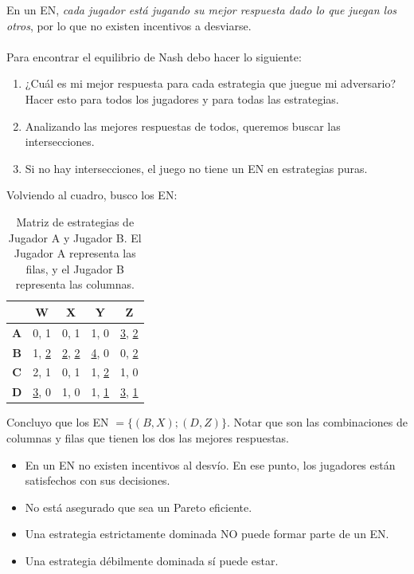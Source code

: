 \documentclass{article}
\newcommand{\ulcolor}[2][Red]{\setulcolor{#1}\ul{#2}}
\begin{document}
                En un EN, \emph{cada jugador está jugando su mejor respuesta dado lo que juegan los otros}, por lo que no existen incentivos a desviarse. \\
                \\
                Para encontrar el equilibrio de Nash debo hacer lo siguiente:
                \begin{enumerate}
                    \item ¿Cuál es mi mejor respuesta para cada estrategia que juegue mi adversario? Hacer esto para todos los jugadores y para todas las estrategias.
                    \item Analizando las mejores respuestas de todos, queremos buscar las intersecciones.
                    \item Si no hay intersecciones, el juego no tiene un EN en estrategias puras.
                \end{enumerate}
                Volviendo al cuadro, busco los EN:
                \begin{table}[H]
                    \centering
                    \begin{tabular}{|c|c|c|c|c|}
                        \hline
                                    & \textbf{W} & \textbf{X} & \textbf{Y} & \textbf{Z} \\ \hline
                        \textbf{A}  & 0, 1 & 0, 1 & 1, 0 & \ulcolor[Red]{3}, \ulcolor[Blue]{2} \\ \hline
                        \textbf{B}  & 1, \ulcolor[Blue]{2} & \ulcolor[Red]{2}, \ulcolor[Blue]{2} & \ulcolor[Red]{4}, 0 & 0, \ulcolor[Blue]{2} \\ \hline
                        \textbf{C}  & 2, 1 & 0, 1 & 1, \ulcolor[Blue]{2} & 1, 0 \\ \hline
                        \textbf{D}  & \ulcolor[Red]{3}, 0 & 1, 0 & 1, \ulcolor[Blue]{1} & \ulcolor[Red]{3}, \ulcolor[Blue]{1} \\ \hline
                    \end{tabular}
                    \caption{Matriz de estrategias de Jugador A y Jugador B. El Jugador A representa las filas, y el Jugador B representa las columnas.}
                \end{table}
                Concluyo que los EN \(= \{(B,X);(D,Z)\}\). Notar que son las combinaciones de columnas y filas que tienen los dos las mejores respuestas. \\
                \begin{itemize}
                    \item En un EN no existen incentivos al desvío. En ese punto, los jugadores están satisfechos con sus decisiones.
                    \item No está asegurado que sea un Pareto eficiente.
                    \item Una estrategia estrictamente dominada NO puede formar parte de un EN.
                    \item Una estrategia débilmente dominada sí puede estar.
                \end{itemize}
\end{document}
